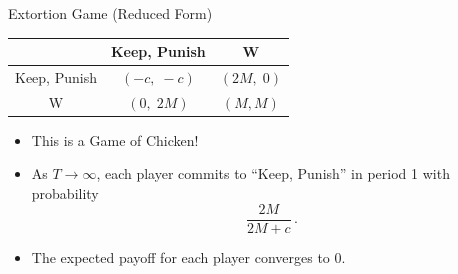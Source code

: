 \documentclass[Output/slides.tex]{subfiles}
\begin{document}
\begin{frame}{Extortion Game (Reduced Form)}
  \centering
  \renewcommand{\arraystretch}{0.7}
  \begin{tabular}{c|cc}
                  & Keep, Punish    & W           \\ \hline
    Keep, Punish   & $(-c,\;-c)$     & $(2M,\;0)$  \\[2pt]
    W               & $(0,\;2M)$      & $(M,M)$     
  \end{tabular}

  \vspace{1ex}

  \begin{itemize}
    \item This is a Game of Chicken!
    \item As $T \to \infty$, each player commits to “Keep, Punish” in period 1 with probability
      \[
        \frac{2M}{2M + c}\,.
      \]
    \item The expected payoff for each player converges to $0$.
  \end{itemize}
\end{frame}
\end{document}
